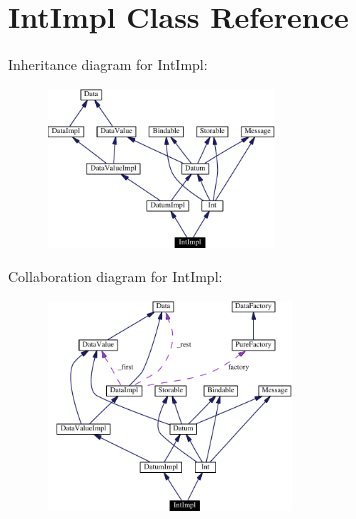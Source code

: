 \hypertarget{classIntImpl}{
\section{Int\-Impl  Class Reference}
\label{classIntImpl}
}
Inheritance diagram for Int\-Impl:\begin{figure}[H]
\begin{center}
\leavevmode
\includegraphics[width=170pt]{classIntImpl__inherit__graph}
\end{center}
\end{figure}
Collaboration diagram for Int\-Impl:\begin{figure}[H]
\begin{center}
\leavevmode
\includegraphics[width=183pt]{classIntImpl__coll__graph}
\end{center}
\end{figure}
